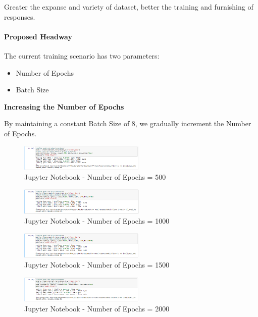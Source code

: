 \documentclass[conference,compsoc]{IEEEtran}
\begin{document}
Greater the expanse and variety of dataset, better the training and furnishing of responses.

\paragraph{Proposed Headway}

The current training scenario has two parameters:
\begin{itemize}
    \item Number of Epochs
    \item Batch Size
\end{itemize}

\textbf{Increasing the Number of Epochs}

By maintaining a constant Batch Size of 8, we gradually increment the Number of Epochs.

\begin{figure}[H]
    \centering
    \includegraphics[width=6cm]{screenshots/jupyter-notebook/nb-epoch-500.png}
    \caption{Jupyter Notebook - Number of Epochs = 500}
\end{figure}

\begin{figure}[H]
    \centering
    \includegraphics[width=6cm]{screenshots/jupyter-notebook/nb-epoch-1000.png}
    \caption{Jupyter Notebook - Number of Epochs = 1000}
\end{figure}

\begin{figure}[H]
    \centering
    \includegraphics[width=6cm]{screenshots/jupyter-notebook/nb-epoch-1500.png}
    \caption{Jupyter Notebook - Number of Epochs = 1500}
\end{figure}

\begin{figure}[H]
    \centering
    \includegraphics[width=6cm]{screenshots/jupyter-notebook/nb-epoch-2000.png}
    \caption{Jupyter Notebook - Number of Epochs = 2000}
\end{figure}
\end{document}

